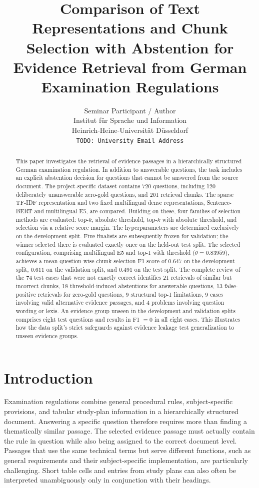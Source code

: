 \documentclass[11pt]{article}
\title{Comparison of Text Representations and Chunk Selection with Abstention for Evidence Retrieval from German Examination Regulations}
\author{Seminar Participant / Author \\
  Institut für Sprache und Information \\
  Heinrich-Heine-Universität Düsseldorf \\
  \texttt{TODO: University Email Address}}
\begin{document}
\maketitle

\begin{abstract}
This paper investigates the retrieval of evidence passages in a hierarchically structured German examination regulation. In addition to answerable questions, the task includes an explicit abstention decision for questions that cannot be answered from the source document. The project-specific dataset contains 720 questions, including 120 deliberately unanswerable zero-gold questions, and 201 retrieval chunks. The sparse TF-IDF representation and two fixed multilingual dense representations, Sentence-BERT and multilingual E5, are compared. Building on these, four families of selection methods are evaluated: top-$k$, absolute threshold, top-$k$ with absolute threshold, and selection via a relative score margin. The hyperparameters are determined exclusively on the development split. Five finalists are subsequently frozen for validation; the winner selected there is evaluated exactly once on the held-out test split. The selected configuration, comprising multilingual E5 and top-1 with threshold ($\theta=0.83959$), achieves a mean question-wise chunk-selection F1 score of $0.647$ on the development split, $0.611$ on the validation split, and $0.491$ on the test split. The complete review of the 74 test cases that were not exactly correct identifies 21 retrievals of similar but incorrect chunks, 18 threshold-induced abstentions for answerable questions, 13 false-positive retrievals for zero-gold questions, 9 structural top-1 limitations, 9 cases involving valid alternative evidence passages, and 4 problems involving question wording or lexis. An evidence group unseen in the development and validation splits comprises eight test questions and results in F1 $=0$ in all eight cases. This illustrates how the data split's strict safeguards against evidence leakage test generalization to unseen evidence groups.
\end{abstract}


\section{Introduction}

Examination regulations combine general procedural rules, subject-specific provisions, and tabular study-plan information in a hierarchically structured document. Answering a specific question therefore requires more than finding a thematically similar passage. The selected evidence passage must actually contain the rule in question while also being assigned to the correct document level. Passages that use the same technical terms but serve different functions, such as general requirements and their subject-specific implementation, are particularly challenging. Short table cells and entries from study plans can also often be interpreted unambiguously only in conjunction with their headings.
\end{document}
